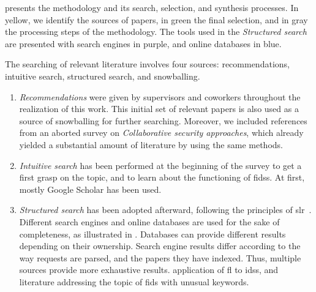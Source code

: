  presents the methodology and its search, selection, and synthesis processes.
In yellow, we identify the sources of papers, in green the final selection, and in gray the processing steps of the methodology.
The tools used in the \emph{Structured search} are presented with search engines in purple, and online databases in blue.

The searching of relevant literature involves four sources: recommendations, intuitive search, structured search, and snowballing.
\begin{enumerate}[(1)]
  \item \emph{Recommendations} were given by supervisors and coworkers throughout the realization of this work.
  This initial set of relevant papers is also used as a source of snowballing for further searching.
  Moreover, we included references from an aborted survey on \emph{Collaborative security approaches}, which already yielded a substantial amount of literature by using the same methods.

  \item \emph{Intuitive search} has been performed at the beginning of the survey to get a first grasp on the topic, and to learn about the functioning of \glspl{fids}.
  At first, mostly Google Scholar has been used.

  \item \emph{Structured search} has been adopted afterward, following the principles of \gls{slr}~\cite{kitchenham_Guidelinesperformingsystematic_2007}.
  Different search engines and online databases are used for the sake of completeness, as illustrated in . Databases can provide different results depending on their ownership.
  Search engine results differ according to the way requests are parsed, and the papers they have indexed.
  Thus, multiple sources provide more exhaustive results.
   application of \gls{fl} to \glspl{ids}, and  literature addressing the topic of \gls{fids} with unusual keywords.


\end{enumerate}
